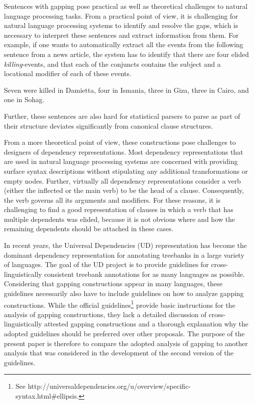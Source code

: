 \documentclass[lucida,biblatex]{sp} %
\newcounter{excounter}
\begin{document}
Sentences with gapping pose practical as well as theoretical 
challenges to natural language processing tasks. From a practical point of view, 
it is challenging for natural language processing systems to identify and resolve the gaps, 
which is necessary to interpret these sentences and extract information from 
them. For example, if one wants to automatically extract all the events from the following sentence from a
news article, the system has to identify that there are four elided {\it killing}-events, and that each of 
the conjuncts contains the subject and a locational modifier of each of these events.
\begin{exe}
  \setcounter{xnumi}{\value{excounter}}
  \ex Seven were killed in Damietta, four in Ismania, three in Giza, three in Cairo,  and one in Sohag.
\end{exe}
Further, these sentences are also hard for statistical parsers to parse as part 
of their structure deviates significantly from canonical clause structures.

From a more theoretical point of view, these constructions pose challenges to 
designers of dependency representations. Most dependency representations
that are used in natural language processing systems
 \citep[e.g.,][]{Surdeanu2008,DeMarneffe2006,Nivre2016}
 are concerned with providing surface syntax descriptions without stipulating 
any additional transformations or empty nodes. Further, virtually all dependency 
representations consider a verb (either the inflected or the main verb) to be the 
head of a clause. Consequently, the verb governs all its arguments and modifiers. 
For these reasons, it is challenging to find a good representation of clauses in which 
a verb that has multiple dependents was elided, because it is not obvious where 
and how the remaining dependents should be attached in these cases.

In recent years, the Universal Dependencies (UD) representation \citep{Nivre2016} 
has become the dominant dependency representation for annotating treebanks in 
 a large variety of languages. The goal of the UD project is to provide guidelines for 
cross-linguistically consistent treebank annotations for as many languages as 
possible. Considering that gapping constructions appear in many languages, 
these guidelines necessarily also have to include guidelines on how to analyze 
gapping constructions. While the official guidelines\footnote{See {http://universaldependencies.org/u/overview/specific-syntax.html\#ellipsis}.} 
provide basic instructions for the 
analysis of gapping constructions, they lack a detailed discussion of 
cross-linguistically attested gapping constructions and a thorough explanation 
why the adopted guidelines should be preferred over other proposals. The purpose 
of the present paper is therefore to compare the adopted analysis of gapping 
to another analysis that was considered in the development of the second version of the
guidelines.
\end{document}
